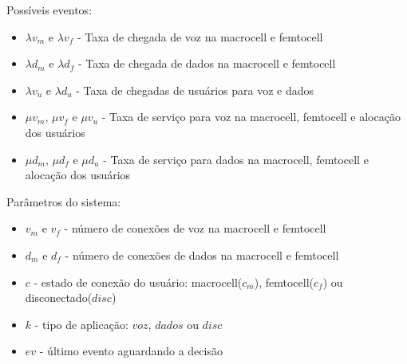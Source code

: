 \begin{frame}
  \begin{block}{Possíveis eventos:}
    \begin{itemize}
      \scriptsize
      \item \alert{$\lambda v _{m}$} e \alert{$\lambda v _{f}$} - Taxa de chegada de voz na macrocell e femtocell
      \item \alert{$\lambda d _{m}$} e \alert{$\lambda d _{f}$} - Taxa de chegada de dados na macrocell e femtocell
      \item \alert{$\lambda v _{u}$} e \alert{$\lambda d _{u}$} - Taxa de chegadas de usuários para voz e dados
      \item \alert{$\mu v _{m}$}, \alert{$\mu v _{f}$} e \alert{$\mu v _{u}$} - Taxa de serviço para voz na macrocell, femtocell e alocação dos usuários
      \item \alert{$\mu d _{m}$}, \alert{$\mu d _{f}$} e \alert{$\mu d _{u}$} - Taxa de serviço para dados na macrocell, femtocell e alocação dos usuários
    \end{itemize}
  \end{block}
  
  \begin{block}{Parâmetros do sistema:}
    \begin{itemize}
      \scriptsize
      \item \alert{$v _{m}$} e \alert{$v _{f}$} - número de conexões de voz na macrocell e femtocell
      \item \alert{$d _{m}$} e \alert{$d _{f}$} - número de conexões de dados na macrocell e femtocell
      \item \alert{$c$} - estado de conexão do usuário: macrocell($c _{m}$), femtocell($c _{f}$) ou disconectado($disc$)
      \item \alert{$k$} - tipo de aplicação: $voz$, $dados$ ou $disc$
      \item \alert{$ev$} - último evento aguardando a decisão
    \end{itemize}
  \end{block}
\end{frame}

